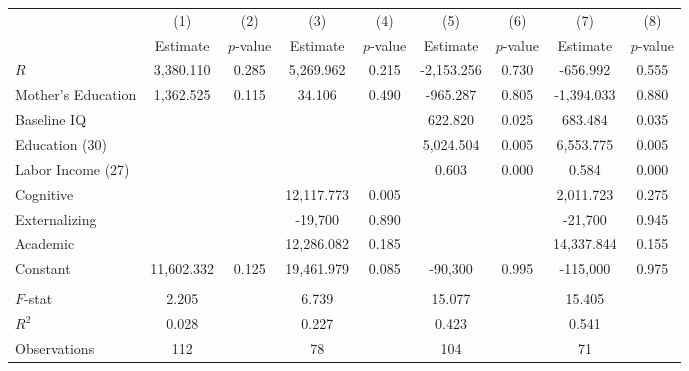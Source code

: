 \begin{tabular}{lcccccccc} \toprule
 & (1) & (2) & (3) & (4) & (5) & (6) & (7) & (8) \\ 
 & Estimate  & $p$-value  & Estimate  & $p$-value  & Estimate  & $p$-value  & Estimate  & $p$-value  \\  \midrule
$R$ &  3,380.110 &     0.285 &  5,269.962 &     0.215 & -2,153.256 &     0.730 &  -656.992 &     0.555 \\  
Mother's Education &  1,362.525 &     0.115 &    34.106 &     0.490 &  -965.287 &     0.805 & -1,394.033 &     0.880 \\  
Baseline IQ &         &         &         &         &   622.820 &     0.025 &   683.484 &     0.035 \\  
Education (30) &         &         &         &         &  5,024.504 &     0.005 &  6,553.775 &     0.005 \\  
Labor Income (27) &         &         &         &         &     0.603 &     0.000 &     0.584 &     0.000 \\  
Cognitive &         &         & 12,117.773 &     0.005 &         &         &  2,011.723 &     0.275 \\  
Externalizing &         &         & -19,700 &     0.890 &         &         & -21,700 &     0.945 \\  
Academic &         &         & 12,286.082 &     0.185 &         &         & 14,337.844 &     0.155 \\  
Constant & 11,602.332 &     0.125 & 19,461.979 &     0.085 & -90,300 &     0.995 & -115,000 &     0.975 \\ \\  \midrule
$F$-stat &     2.205 &         &     6.739 &         &    15.077 &         &    15.405 &         \\  
$R^2$ &     0.028 &         &     0.227 &         &     0.423 &         &     0.541 &         \\  
Observations &   112 &         &    78 &         &   104 &         &    71 &         \\  
\bottomrule
\end{tabular}

